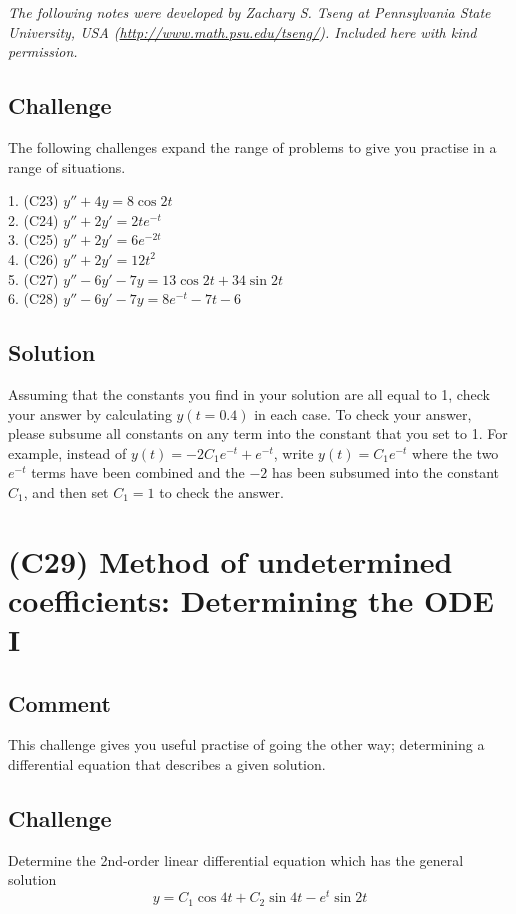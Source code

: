\emph{The following notes were developed by Zachary S. Tseng at Pennsylvania State University, USA (\url{http://www.math.psu.edu/tseng/}). Included here with kind permission.}



\subsection*{Challenge}
The following challenges expand the range of problems to give you practise in a range of situations.

1. (C23) $y'' + 4y = 8 \cos 2t$\\
2. (C24) $y'' + 2y' = 2 te^{-t}$\\
3. (C25) $y'' + 2y' = 6 e^{-2t}$\\
4. (C26) $y'' + 2y' = 12 t^2$\\
5. (C27) $y'' - 6y' - 7y = 13 \cos 2t + 34 \sin 2t$\\
6. (C28) $y'' - 6y' - 7y = 8e^{-t} - 7t - 6$

\subsection*{Solution}
Assuming that the constants you find in your solution are all equal to 1, check your answer by calculating $y(t=0.4)$ in each case. To check your answer, please subsume all constants on any term into the constant that you set to 1. For example, instead of $y(t) = -2 C_1 e^{-t} + e^{-t}$, write $y(t) = C_1 e^{-t}$ where the two $e^{-t}$ terms have been combined and the $-2$ has been subsumed into the constant $C_1$, and then set $C_1 = 1$ to check the answer.




\newpage
\section{(C29) Method of undetermined coefficients: Determining the ODE I}

\subsection*{Comment}
This challenge gives you useful practise of going the other way; determining a differential equation that describes a given solution.

\subsection*{Challenge}
Determine the 2nd-order linear differential equation which has the general solution
\begin{equation}
    y = C_1 \cos 4t + C_2 \sin 4t - e^t \sin 2t
\end{equation}


